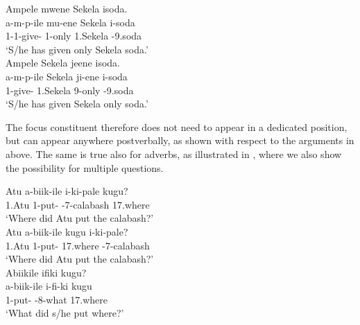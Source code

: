 \documentclass[output=paper]{langscibook}
\begin{document}
\ea
\label{soda}
\ea
\label{bkm:Ref136343822}
Ampele mwene Sekela isoda.\\
\gll
a-m-p-ile  mu-ene  Sekela  i-soda\\
1\SM{}-1\OM{}-give-\PFV{}  1-only  1.Sekela  \AUG{}-9.soda\\
\glt
‘S/he has given only Sekela soda.’\\

\ex
\label{bkm:Ref90048089}
{Ampele} {Sekela} {jeene} {isoda}.\\
\gll
{a-m-p-ile}  {Sekela}  {ji-ene}  {i-soda}\\
{1\OM{}-give-\PFV{}}  {1.Sekela}  {9-only}  {\AUG{}-9.soda}\\
\glt
‘S/he has given Sekela only soda.’\\

\z
\z

The focus constituent therefore does not need to appear in a dedicated position, but can appear anywhere postverbally, as shown with respect to the arguments in  above. The same is true also for adverbs, as illustrated in , where we also show the possibility for multiple questions.

\ea
\label{bkm:Ref90636091}
\ea
\label{bkm:Ref90636091:a}
\gll
Atu  a-biik-ile  i-ki-pale   kugu?\\
1.Atu  1\SM{}-put-\PFV{}  \AUG{}-7-calabash   17.where~\\
\glt
‘Where did Atu put the calabash?’\\


\ex
\label{bkm:Ref90636091:b}
\gll
Atu  a-biik-ile  kugu   i-ki-pale?\\
1.Atu  1\SM{}-put-\PFV{}  17.where   \AUG{}-7-calabash~\\
\glt
‘Where did Atu put the calabash?’\\



\ex
\label{bkm:Ref90636091:c}
Abiikile ifiki kugu?\\
\gll
a-biik-ile  i-fi-ki  kugu\\
1\SM{}-put-\PFV{}  \AUG{}-8-what  17.where\\
\glt
‘What did s/he put where?’\\
\end{document}
